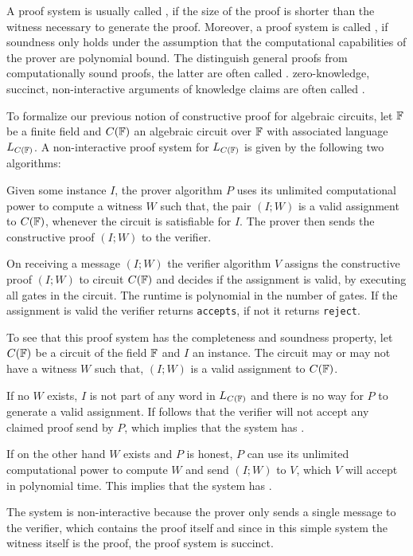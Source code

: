 A proof system is usually called , if the size of the proof is shorter than the witness necessary to generate the proof. Moreover, a proof system is called , if soundness only holds under the assumption that the computational capabilities of the prover are polynomial bound. The distinguish general proofs from computationally sound proofs, the latter are often called . zero-knowledge, succinct, non-interactive arguments of knowledge claims are often called .
\begin{example} To formalize our previous notion of constructive proof for algebraic circuits, let $\mathbb{F}$ be a finite field and $C(\mathbb{F})$ an algebraic circuit over $\mathbb{F}$ with associated language $L_{C(\mathbb{F})}$. A non-interactive proof system for $L_{C(\mathbb{F})}$ is given by the following two algorithms:

Given some instance $I$, the prover algorithm $P$ uses its unlimited computational power to compute a witness $W$ such that,  the pair $(I;W)$ is a valid assignment to $C(\mathbb{F})$, whenever the circuit is satisfiable for $I$. The prover then sends the constructive proof $(I;W)$ to the verifier.

On receiving a message $(I;W)$ the verifier algorithm $V$ assigns the constructive proof $(I;W)$ to circuit $C(\mathbb{F})$ and decides if the assignment is valid, by executing all gates in the circuit. The runtime is polynomial in the number of gates. If the assignment is valid the verifier returns \texttt{accepts}, if not it returns \texttt{reject}. 

To see that this proof system has the completeness and soundness property, let $C(\mathbb{F})$ be a circuit of the field $\mathbb{F}$ and $I$ an instance. The circuit may or may not have a witness $W$ such that,  $(I;W)$ is a valid assignment to $C(\mathbb{F})$. 

If no $W$ exists, $I$ is not part of any word in $L_{C(\mathbb{F})}$ and there is no way for $P$ to generate a valid assignment. If follows that the verifier will not accept any claimed proof send by $P$, which implies that the system has .

If on the other hand $W$ exists and $P$ is honest, $P$ can use its unlimited computational power to compute $W$ and send $(I;W)$ to $V$, which $V$ will accept in polynomial time. This implies that the system has .

The system is non-interactive because the prover only sends a single message to the verifier, which contains the proof itself and since in this simple system the witness itself is the proof, the proof system is  succinct.
\end{example}
